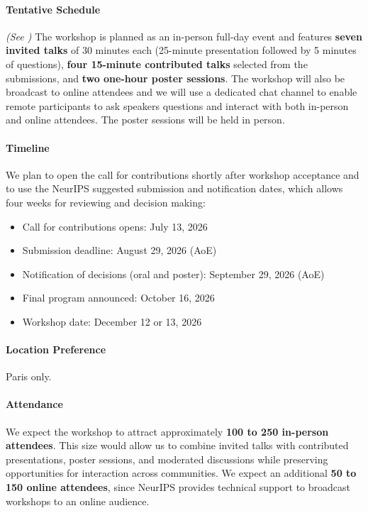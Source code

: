 \documentclass{article}
\begin{document}
\paragraph{Tentative Schedule} \textit{(See )}\;  The workshop is planned as an in-person full-day event and features \textbf{seven invited talks} of 30 minutes each (25-minute presentation followed by 5 minutes of questions), \textbf{four 15-minute contributed talks} selected from the submissions, and \textbf{two one-hour poster sessions}. The workshop will also be broadcast to online attendees and we will use a dedicated chat channel to enable remote participants to ask speakers questions and interact with both in-person and online attendees. The poster sessions will be held in person. 

\paragraph{Timeline} We plan to open the call for contributions shortly after workshop acceptance and to use the NeurIPS suggested submission and notification dates, which allows four weeks for reviewing and decision making:    
\begin{itemize}[leftmargin=6mm]
    \item Call for contributions opens: July 13, 2026
    \item Submission deadline: August 29, 2026 (AoE)
    \item Notification of decisions (oral and poster): September 29, 2026 (AoE)
    \item Final program announced: October 16, 2026
    \item Workshop date: December 12 or 13, 2026
\end{itemize}

\paragraph{Location Preference} Paris only.

\paragraph{Attendance} We expect the workshop to attract approximately \textbf{100 to 250 in-person attendees}. This size would allow us to combine invited talks with contributed presentations, poster sessions, and moderated discussions while preserving opportunities for interaction across communities. We expect an additional \textbf{50 to 150 online attendees}, since NeurIPS provides technical support to broadcast workshops to an online audience.
\end{document}
